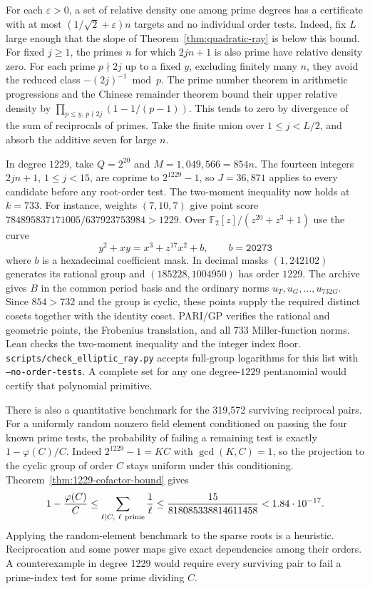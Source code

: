 \documentclass[11pt]{article}
\newcommand{\F}{\mathbb F_2}
\begin{document}
For each \(\varepsilon>0\), a set of relative density one among prime
degrees has a certificate with at most \((1/\sqrt2+\varepsilon)n\)
targets and no individual order tests. Indeed, fix \(L\) large enough
that the slope of Theorem~\ref{thm:quadratic-ray} is below this bound.
For fixed \(j\ge1\), the primes \(n\) for which \(2jn+1\) is also prime
have relative density zero. For each prime \(p\nmid2j\) up to a fixed
\(y\), excluding finitely many \(n\), they avoid the reduced class
\(-(2j)^{-1}\bmod p\). The prime number theorem in arithmetic
progressions and the Chinese remainder theorem bound their upper
relative density by \(\prod_{p\le y,\,p\nmid2j}(1-1/(p-1))\).
This tends to zero by divergence of the sum of reciprocals of primes.
Take the finite union over \(1\le j<L/2\), and absorb the additive
seven for large \(n\).

In degree \(1229\), take \(Q=2^{20}\) and \(M=1{,}049{,}566=854n\).
The fourteen integers \(2jn+1\), \(1\le j<15\), are coprime to
\(2^{1229}-1\), so \(J=36{,}871\) applies to every candidate before
any root-order test. The two-moment inequality now holds at \(k=733\).
For instance, weights \((7,10,7)\) give point score
\(784895837171005/637923753984>1229\).
Over \(\F[z]/(z^{20}+z^3+1)\) use the curve
\[
 y^2+xy=x^3+z^{17}x^2+b,\qquad b=\mathtt{20273}
\]
where \(b\) is a hexadecimal coefficient mask. In decimal masks
\((1,242102)\) generates its rational group and
\((185228,1004950)\) has order \(1229\).
The archive gives \(B\) in the common period basis and the ordinary
norms \(u_T,u_G,\ldots,u_{732G}\). Since \(854>732\) and the group
is cyclic, these points supply the required distinct cosets together
with the identity coset. PARI/GP verifies the rational and geometric
points, the Frobenius translation, and all 733 Miller-function norms.
Lean checks the two-moment inequality and the integer index floor.
\nolinkurl{scripts/check_elliptic_ray.py} accepts full-group logarithms
for this list with \texttt{--no-order-tests}. A complete set for any
one degree-\(1229\) pentanomial would certify that polynomial primitive.

There is also a quantitative benchmark for the 319,572 surviving
reciprocal pairs. For a uniformly random nonzero field element
conditioned on passing the four known prime tests, the probability
of failing a remaining test is exactly \(1-\varphi(C)/C\).
Indeed \(2^{1229}-1=KC\) with \(\gcd(K,C)=1\), so the projection to
the cyclic group of order \(C\) stays uniform under this conditioning.
Theorem~\ref{thm:1229-cofactor-bound} gives
\[
  1-\frac{\varphi(C)}{C}
    \le \sum_{\ell\mid C,\ \ell\ {\rm prime}}\frac1\ell
    \le \frac{15}{818085338814611458}<1.84\cdot10^{-17}.
\]
Applying the random-element benchmark to the sparse roots is a
heuristic. Reciprocation and some power maps give exact dependencies
among their orders. A counterexample in degree 1229 would require
every surviving pair to fail a prime-index test for some prime dividing \(C\).
\end{document}
